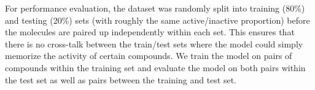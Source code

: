 

For performance evaluation, the dataset was randomly split into training (80\%) and testing (20\%) sets (with roughly the same active/inactive proportion) before the molecules are paired up independently within each set. This ensures that there is no cross-talk between the train/test sets where the model could simply memorize the activity of certain compounds. We train the model on pairs of compounds within the training set and evaluate the model on both pairs within the test set as well as pairs between the training and test set.


